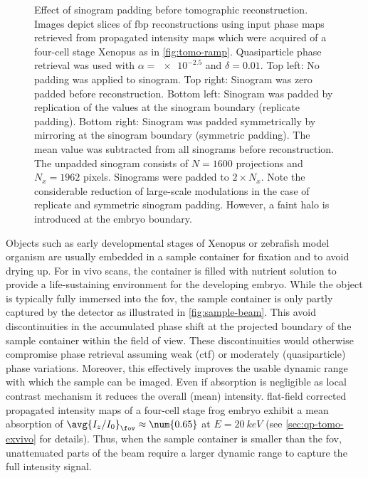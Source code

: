 \documentclass[
twoside,
openright,
titlepage,
numbers=noenddot,
headinclude,
fleqn,
a4paper,
footinclude=true,
cleardoublepage=empty,
abstractoff,
BCOR=5mm,
paper=a4,
fontsize=11pt,
british,ngerman,american,
]{scrreprt}
\begin{document}
\begin{figure}
  \caption[Effect of sinogram padding before tomographic
  reconstruction.]{Effect of sinogram padding before tomographic
    reconstruction.  Images depict slices of \ac{fbp} reconstructions
    using input phase maps retrieved from propagated intensity maps
    which were acquired of a four-cell stage Xenopus as in
    \cref{fig:tomo-ramp}.  Quasiparticle phase retrieval was used with
    $\alpha = \num{e-2.5}$ and $\delta=\num{0.01}$.  Top left: No
    padding was applied to sinogram.  Top right: Sinogram was zero
    padded before reconstruction.  Bottom left: Sinogram was padded by
    replication of the values at the sinogram boundary (replicate
    padding).  Bottom right: Sinogram was padded symmetrically by
    mirroring at the sinogram boundary (symmetric padding).  The mean
    value was subtracted from all sinograms before reconstruction.
    The unpadded sinogram consists of $N=\num{1600}$ projections and
    $N_x=\num{1962}$ pixels.  Sinograms were padded to $2\times N_x$.
    Note the considerable reduction of large-scale modulations in the
    case of replicate and symmetric sinogram padding.  However, a
    faint halo is introduced at the embryo boundary.  }
  \label{fig:tomo-padding}
\end{figure}

Objects such as early developmental stages of Xenopus or zebrafish
model organism are usually embedded in a sample container for fixation
and to avoid drying up.  For in vivo scans, the container is filled
with nutrient solution to provide a life-sustaining environment for
the developing embryo.  While the object is typically fully immersed
into the \acf{fov}, the sample container is only partly captured by
the detector as illustrated in \cref{fig:sample-beam}.  This avoid
discontinuities in the accumulated phase shift at the projected
boundary of the sample container within the field of view.  These
discontinuities would otherwise compromise phase retrieval assuming
weak (\ac{ctf}) or moderately (quasiparticle) phase variations.
Moreover, this effectively improves the usable dynamic range with
which the sample can be imaged.  Even if absorption is negligible as
local contrast mechanism it reduces the overall (mean) intensity.
\Eg{} flat-field corrected propagated intensity maps of a four-cell
stage frog embryo exhibit a mean absorption of
$\avg{I_z/I_0}_\fov\approx\num{0.65}$ at $E=\SI{20}{keV}$ (see
\cref{sec:qp-tomo-exvivo} for details).  Thus, when the sample
container is smaller than the \acl{fov}, unattenuated parts of the
beam require a larger dynamic range to capture the full intensity
signal.
\end{document}
